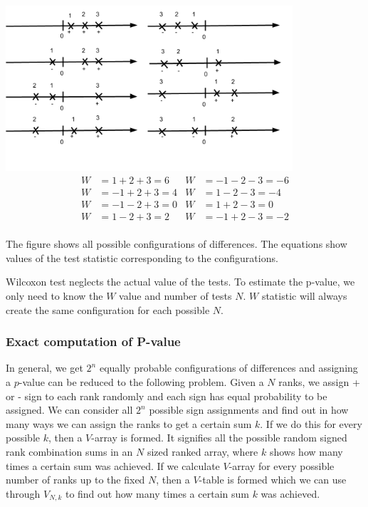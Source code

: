 \documentclass[12pt]{article}
\begin{document}
{\begin{table}
  \begin{center}
    \includegraphics[width=0.8\textwidth]{rankSignsExample}\\
    \begin{align*}
        W&= 1 + 2 + 3 = 6 & W&=-1 - 2 - 3 = -6\\
        W&= -1 + 2 + 3 = 4 & W&= 1 - 2 - 3 = -4\\
        W&= -1 - 2 + 3 = 0 & W&= 1 + 2 - 3 = 0\\
        W&= 1 - 2 + 3 = 2 & W&= -1 + 2 - 3 = -2\\
    \end{align*}
    \caption{The figure shows all possible configurations of differences. The equations show values of the test statistic corresponding to the configurations.}
    \label{table:adding_w_results}
  \end{center}
\end{table}

Wilcoxon test neglects the actual value of the tests. To estimate the p-value, we only need to know the $W$ value and number of tests $N$. $W$ statistic will always create the same configuration for each possible $N$.

\subsubsection{Exact computation of P-value}
\label{sec:exact_computation_of_p-value}
In general, we get $2^n$ equally probable configurations of differences and assigning a $p$-value can be reduced to the following problem. Given a $N$ ranks, we assign + or - sign to each rank randomly and each sign has equal probability to be assigned. We can consider all $2^n$ possible sign assignments and find out in how many ways we can assign the ranks to get a certain sum $k$. If we do this for every possible $k$, then a $V$-array is formed. It signifies all the possible random signed rank combination sums in an $N$ sized ranked array, where $k$ shows how many times a certain sum was achieved. If we calculate $V$-array for every possible number of ranks up to the fixed $N$, then a $V$-table is formed which we can use through $V_{N, k}$ to find out how many times a certain sum $k$ was achieved.

}
\end{document}
